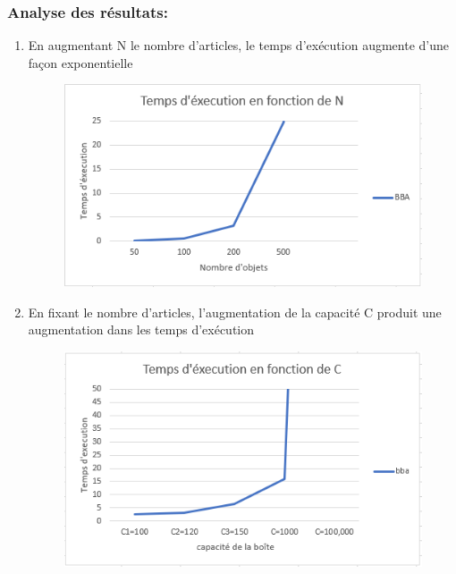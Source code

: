 \documentclass[12pt]{article}
\begin{document}
\subsubsection{Analyse des résultats:}
\begin{enumerate}
    \item En augmentant N le nombre d’articles, le temps d'exécution augmente d’une façon exponentielle
    \begin{figure}[H]
        \includegraphics[width=13.5cm]{../figures/graph2.png}
    \end{figure}
    \item En fixant le nombre d’articles, l’augmentation de la capacité C produit une augmentation dans les temps d’exécution
    \begin{figure}[H]
        \includegraphics[width=13.5cm]{../figures/graph3.png}
    \end{figure}
\end{enumerate}
\end{document}
